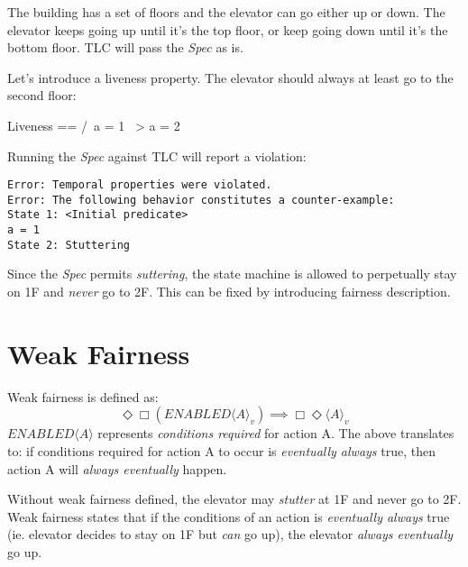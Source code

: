 The building has a set of floors and the elevator can go either up or down. The
elevator keeps going up until it's the top floor, or keep going down until it's
the bottom floor. TLC will pass the \textit{Spec} as is.\newline

Let's introduce a liveness property. The elevator should always at least go 
to the second floor:\newline
\begin{tla}
Liveness == 
    /\ a = 1 ~> a = 2
\end{tla}
\begin{tlatex}
%
%
\end{tlatex}
\newline

Running the \textit{Spec} against TLC will report a violation:

\begin{verbatim}
Error: Temporal properties were violated.
Error: The following behavior constitutes a counter-example:
State 1: <Initial predicate>
a = 1
State 2: Stuttering
\end{verbatim}

Since the \textit{Spec} permits \textit{suttering}, the state machine is allowed
to perpetually stay on 1F and \textit{never} go to 2F. This can be fixed by
introducing fairness description.

\section{Weak Fairness}

Weak fairness is defined as:\newline
\begin{equation} 
\Diamond\Box(ENABLED\langle A \rangle _v) \implies \Box\Diamond\langle A \rangle _v
\end{equation}
$ENABLED\langle A \rangle$ represents \textit{conditions required} for action A.
The above translates to: if conditions required for action A to occur is
\textit{eventually always} true, then action A will \textit{always eventually}
happen.\newline 

Without weak fairness defined, the elevator may \textit{stutter} at 1F and
never go to 2F. Weak fairness states that if the conditions of an action is
\textit{eventually always} true (ie. elevator decides to stay on 1F but 
\textit{can} go up), the elevator \textit{always eventually} go up.\newline

